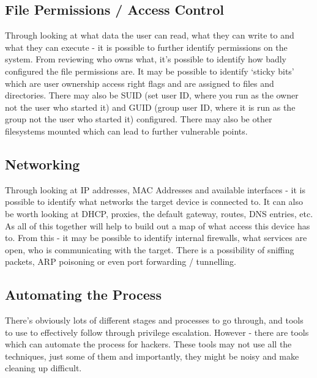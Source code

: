 \subsection{File Permissions / Access Control}
Through looking at what data the user can read, what they can write to and what they can execute - it is possible to further identify permissions on the system. From reviewing who owns what, it's possible to identify how badly configured the file permissions are. It may be possible to identify `sticky bits' which are user ownership access right flags and are assigned to files and directories. There may also be SUID (set user ID, where you run as the owner not the user who started it) and GUID (group user ID, where it is run as the group not the user who started it) configured. There may also be other filesystems mounted which can lead to further vulnerable points. 

\subsection{Networking}
Through looking at IP addresses, MAC Addresses and available interfaces - it is possible to identify what networks the target device is connected to. It can also be worth looking at DHCP, proxies, the default gateway, routes, DNS entries, etc. As all of this together will help to build out a map of what access this device has to. From this - it may be possible to identify internal firewalls, what services are open, who is communicating with the target. There is a possibility of sniffing packets, ARP poisoning or even port forwarding / tunnelling. 

\subsection{Automating the Process}
There's obviously lots of different stages and processes to go through, and tools to use to effectively follow through privilege escalation. However - there are tools which can automate the process for hackers. These tools may not use all the techniques, just some of them and importantly, they might be noisy and make cleaning up difficult.
